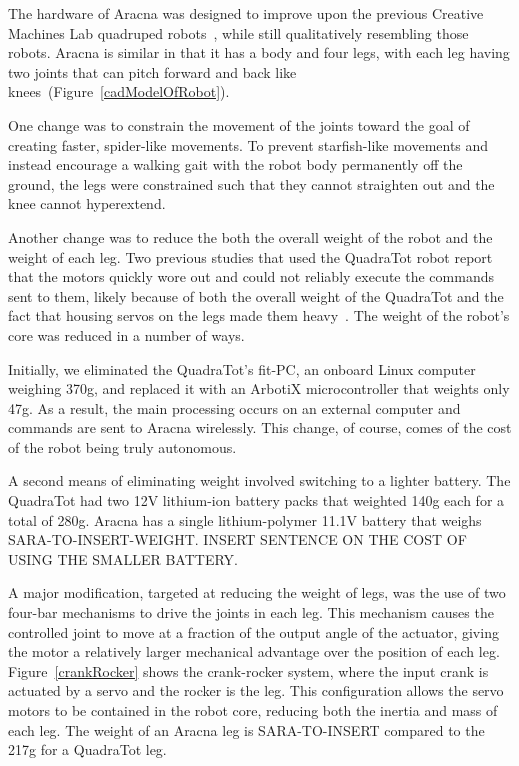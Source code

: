 \documentclass[letterpaper]{article}
\begin{document}

The hardware of Aracna was designed to improve upon the previous Creative Machines Lab
quadruped robots~\citep{bongard2006resilient, yosinski2011gaits}, while still qualitatively resembling those robots. Aracna is similar in that it has a body and four legs, with each leg having two joints that can pitch forward and back like knees~(Figure~\ref{cadModelOfRobot}). 

One change was to constrain the movement of the
joints toward the goal of creating faster, spider-like movements. To
prevent starfish-like movements and instead encourage a walking gait with the robot body permanently off the ground, the legs were constrained such that they cannot straighten out and the knee cannot hyperextend. 

Another change was to reduce the both the overall weight of the robot and the weight of each leg. Two previous studies that used the QuadraTot robot report that the motors quickly wore out and could not reliably execute the commands sent to them, likely because of both the overall weight of the QuadraTot and the fact that housing servos on the legs made them heavy~\citep{bongard2006resilient, yosinski2011gaits}. The weight of the robot's core was reduced in a number of ways. 

Initially, we eliminated the QuadraTot's fit-PC, an onboard Linux computer weighing 370g, and replaced it with an ArbotiX microcontroller that weights only 47g. As a result, the main processing occurs on an external computer and commands are sent to Aracna wirelessly. This change, of course, comes of the cost of the robot being truly autonomous. 

A second means of eliminating weight involved switching to a lighter battery. The QuadraTot had two 12V lithium-ion battery packs that weighted 140g each for a total of 280g. Aracna has a single lithium-polymer 11.1V battery that weighs SARA-TO-INSERT-WEIGHT. INSERT SENTENCE ON THE COST OF USING THE SMALLER BATTERY.   

A major modification, targeted at reducing the weight of legs, was the use of two four-bar mechanisms to drive the joints in each
leg. This mechanism causes the controlled joint to move at a fraction
of the output angle of the actuator, giving the motor a relatively
larger mechanical advantage over the position of each leg.
Figure~\ref{crankRocker} shows the crank-rocker system, where the input crank
is actuated by a servo and the rocker is the leg. This
configuration allows the servo motors to be contained in the robot core, reducing both the inertia and mass of each leg. The weight of an Aracna leg is SARA-TO-INSERT compared to the 217g for a QuadraTot leg.  
\end{document}
